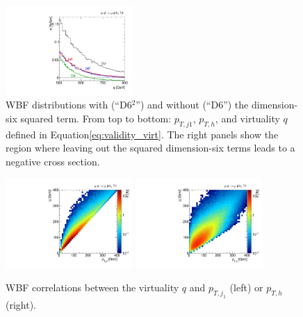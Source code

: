 \begin{figure}
  \hspace*{0.05\textwidth}
  \includegraphics[width=0.43\textwidth]{fig/validity/WBF_T4_q.pdf}
  \caption{WBF distributions with (``D6$^{2}$'') and without (``D6'') the
    dimension-six squared term. From top to bottom: $p_{T,j1}$, $p_{T,h}$, and
    virtuality $q$ defined in Equation\;\eqref{eq:validity_virt}. The right panels show the region where
    leaving out the squared dimension-six terms leads to a negative cross
    section.}
  \label{fig:validity_squared_WBF}
\end{figure}


\begin{figure}[t]
  \includegraphics[width=0.43\textwidth]{fig/validity/WBF_correl_q_j1pt.pdf}
  \hspace*{0.05\textwidth}
  \includegraphics[width=0.43\textwidth]{fig/validity/WBF_correl_q_Hpt.pdf} 
  \caption{WBF correlations between the virtuality $q$ and
    $p_{T,j_1}$ (left) or $p_{T,h}$ (right).}
  \label{fig:validity_virt_corr}
\end{figure}

